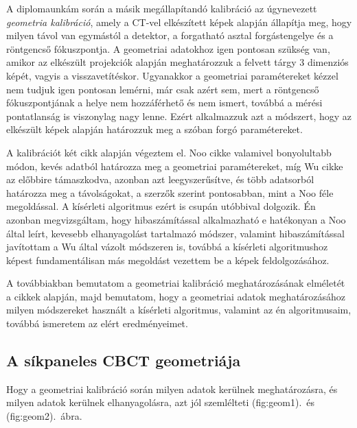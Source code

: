 \documentclass[a4paper,12pt,twoside]{article}
\begin{document}
A diplomaunkám során a másik megállapítandó kalibráció az úgynevezett \emph{geometria kalibráció}, amely a CT-vel elkészített képek alapján állapítja meg, hogy milyen távol van egymástól a detektor, a forgatható asztal forgástengelye és a röntgencső fókuszpontja. A geometriai adatokhoz igen pontosan szükség van, amikor az elkészült projekciók alapján meghatározzuk a felvett tárgy 3 dimenziós képét, vagyis a visszavetítéskor. Ugyanakkor a geometriai paramétereket kézzel nem tudjuk igen pontosan lemérni, már csak azért sem, mert a röntgencső fókuszpontjának a helye nem hozzáférhető és nem ismert, továbbá a mérési pontatlanság is viszonylag nagy lenne. Ezért alkalmazzuk azt a módszert, hogy az elkészült képek alapján határozzuk meg a szóban forgó paramétereket. 

A kalibrációt két cikk alapján végeztem el. Noo cikke\cite{noo} valamivel bonyolultabb  módon, kevés adatból határozza meg a geometriai paramétereket, míg Wu\cite{wu} cikke az előbbire támaszkodva, azonban azt leegyszerűsítve,  és több adatsorból határozza meg a távolságokat, a szerzők szerint pontosabban, mint a Noo féle megoldással. A kísérleti algoritmus ezért is csupán utóbbival dolgozik. Én azonban megvizsgáltam, hogy hibaszámítással alkalmazható e hatékonyan a Noo által leírt, kevesebb elhanyagolást tartalmazó módszer, valamint hibaszámítással javítottam a Wu által vázolt módszeren is, továbbá a kísérleti algoritmushoz képest fundamentálisan más megoldást vezettem be a képek feldolgozásához.

 A továbbiakban bemutatom a geometriai kalibráció meghatározásának elméletét a cikkek alapján, majd bemutatom, hogy a geometriai adatok meghatározásához milyen módszereket használt a kísérleti algoritmus, valamint az én algoritmusaim, továbbá ismeretem az elért eredményeimet. 

\subsection{A síkpaneles CBCT geometriája}

Hogy a geometriai kalibráció során milyen adatok kerülnek meghatározásra, és milyen adatok kerülnek elhanyagolásra, azt jól szemlélteti \aref({fig:geom1}).\ és \aref({fig:geom2}).~ábra. 
\end{document}
